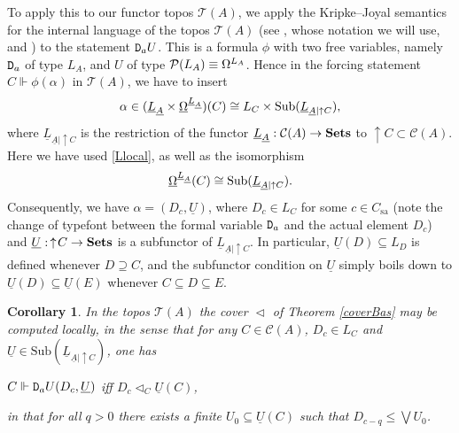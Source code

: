 \documentclass[11pt]{article}
\newcommand{\drie}{\vartriangleleft}
\newcommand{\beq}{\begin{equation}}
\newcommand{\eeq}{\end{equation}}
\newcommand{\Sets}{\mbox{\textbf{Sets}}}
\newcommand{\raw}{\rightarrow} \newcommand{\rat}{\mapsto}
\newcommand{\x}{\times} \newcommand{\hb}{\hbar}
\newcommand{\er}{\eqref}
\newcommand{\al}{\alpha} \newcommand{\bt}{\beta}
\newcommand{\CA}{{\mathcal A}} \newcommand{\CB}{{\mathcal B}}
\newcommand{\alg}[1]{\ensuremath{#1}}
\newcommand{\context}{\ensuremath{\mathcal{C}}}
\newcommand{\asstopos}{\ensuremath{\mathcal{T}}}
\newcommand{\sa}{\ensuremath{_{\mathrm{sa}}}}
\newcommand{\prop}[1]{\ensuremath{\mbox{\texttt{#1}}}}
\newcommand{\uA}{\underline{A}}
\renewcommand{\CA}{\mathcal{C}(A)}
\newcommand{\TA}{\mathcal{T}(A)}
\renewcommand{\TA}{\asstopos(\alg{A})}
\renewcommand{\CA}{\context(\alg{A})}
\newtheorem{corollary}[theorem]{Corollary}
\begin{document}
To apply this to our functor topos $\TA$, we apply  the Kripke--Joyal semantics for the internal language of the topos $\TA$ (see \cite[\S VI.7]{maclanemoerdijk92}, whose notation we will use, and \cite[\S 6.6]{borceux3}) to the  statement 
$\prop{D}_a \drie U$. This is a formula $\phi$ with two free variables, namely $\prop{D}_a$ 
 of type $L_A$, and $U$ of type ${\mathcal P}(L_A)\equiv \Omega^{L_A}$. Hence in the forcing statement 
 $C\Vdash \phi(\al)$ in $\TA$, we have to insert
 $$ \al\in (\underline{L}_{\uA}\x \underline{\Om}^{\underline{L}_{\uA}})(C)\cong L_C\x \mathrm{Sub}(\underline{L}_{\uA|\uparrow C}),$$
 where $\underline{L}_{\uA|\uparrow C}$ is the restriction of the functor $\underline{L}_{\uA}:\CA\raw\Sets$ to $\uparrow\!C\subset\CA$.
 Here we have used \er{Llocal}, as well as  the isomorphism  \cite[\S II.8]{maclanemoerdijk92}
 \beq \underline{\Om}^{\underline{L}_{\uA}}(C)\cong\mathrm{Sub}(\underline{L}_{\uA|\uparrow C}).
 \label{Yoneda}
 \eeq
 Consequently, we have $\al=(D_c,\underline{U})$, where $D_c\in L_C$ for some $c\in C\sa$ (note the change of typefont between the formal variable
 $\prop{D}_a$ and the actual element $D_c$) and $\underline{U}:\, \uparrow\!C\raw\Sets$ is a subfunctor of 
 $\underline{L}_{\uA|\uparrow C}$. In particular, $\underline{U}(D)\subseteq L_D$ is defined whenever $D\supseteq C$, and
 the subfunctor condition on $\underline{U}$ simply boils down to $\underline{U}(D)\subseteq \underline{U}(E)$
 whenever $C\subseteq D\subseteq E$.
\begin{corollary}\label{coverBas2}
In the topos $\TA$  the cover $\drie$ of Theorem \ref{coverBas} may be computed locally, in the sense that  for any 
$C\in \CA$, $D_c\in L_C$ and $\underline{U}\in \mathrm{Sub}(\underline{L}_{\uA|\uparrow C})$,
one has\begin{center}
$C\Vdash \prop{D}_a \drie {U}(D_c,\underline{U})$ iff  $D_c \drie_C \underline{U}(C)$,
\end{center}
in that for all  $q>0$ there exists a finite $U_0\subseteq \underline{U}(C)$ such that ${D}_{c-q}\leqslant\bigvee U_0$.
  \end{corollary}  
\end{document}
